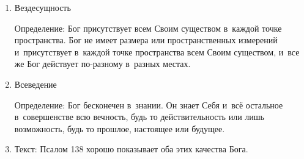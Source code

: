 \documentclass[a4paper,12pt]{article}
\begin{document}
\begin{enumerate}
    \item Вездесущность 
    
Определение: Бог присутствует всем Своим существом в~каждой точке пространства. Бог не имеет размера или пространственных измерений и~присутствует в~каждой точке пространства всем Своим существом, и~все же Бог действует по-разному в~разных местах.

    \item Всеведение 

Определение: Бог бесконечен в~знании. Он знает Себя и~всё остальное в~совершенстве всю вечность, будь то действительность или лишь возможность, будь то прошлое, настоящее или будущее.

    \item Текст: Псалом 138 хорошо показывает оба этих качества Бога. 
\end{enumerate}
\end{document}
